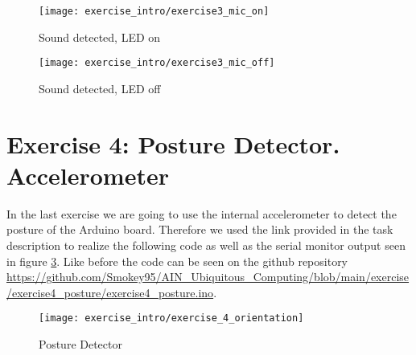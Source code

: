 \begin{figure}[h]
  \centering
  \texttt{[image: exercise\_intro/exercise3\_mic\_on]}
  \caption{Sound detected, LED on}
  \label{fig:microphone_on}
\end{figure}

\begin{figure}[h]
  \centering
  \texttt{[image: exercise\_intro/exercise3\_mic\_off]}
  \caption{Sound detected, LED off}
  \label{fig:microphone_off}
\end{figure}


\section{Exercise 4: Posture Detector. Accelerometer}

In the last exercise we are going to use the internal accelerometer to detect the posture of the Arduino board.
Therefore we used the link provided in the task description to realize the following code as well as the serial monitor output seen in figure \ref{posture_detector}.
Like before the code can be seen on the github repository \url{https://github.com/Smokey95/AIN_Ubiquitous_Computing/blob/main/exercise/exercise4_posture/exercise4_posture.ino}.

\begin{figure}[h]
  \centering
  \texttt{[image: exercise\_intro/exercise\_4\_orientation]}
  \caption{Posture Detector}
  \label{posture_detector}
\end{figure}